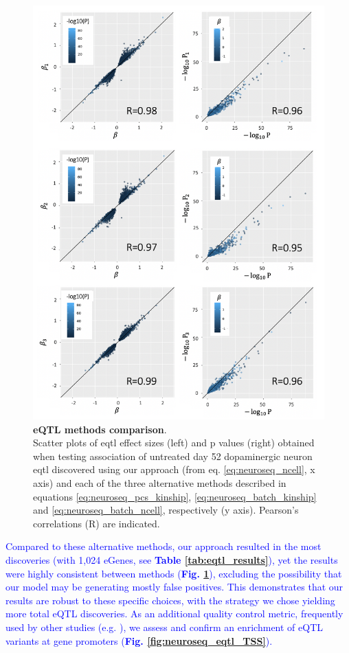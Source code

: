 \begin{figure}[htbp]
\centering
\includegraphics[width=13.5cm]{Chapter5/Fig/neuroseq_eqtl_methods_corr.png}
\caption[eQTL methods comparison]{\textbf{eQTL methods comparison}.\\
Scatter plots of \gls{eqtl} effect sizes (left) and p values (right) obtained when testing association of untreated day 52 dopaminergic neuron \gls{eqtl} discovered using our approach (from eq. \eqref{eq:neuroseq_ncell}, x axis) and each of the three alternative methods described in equations \eqref{eq:neuroseq_pcs_kinship}, \eqref{eq:neuroseq_batch_kinship} and \eqref{eq:neuroseq_batch_ncell}, respectively (y axis). 
Pearson's correlations (R) are indicated.}
\label{fig:neuroseq_eqtl_methods_comp}
\end{figure}


\textcolor{blue}{Compared to these alternative methods, our approach resulted in the most discoveries (with 1,024 eGenes, see \textbf{Table \ref{tab:eqtl_results}}), yet the results were highly consistent between methods (\textbf{Fig. \ref{fig:neuroseq_eqtl_methods_comp}}), excluding the possibility that our model may be generating mostly false positives.
This demonstrates that our results are robust to these specific choices, with the strategy we chose yielding more total eQTL discoveries. 
As an additional quality control metric, frequently used by other studies (e.g. \cite{gtex2015genotype}), we assess and confirm an enrichment of eQTL variants at gene promoters (\textbf{Fig. \ref{fig:neuroseq_eqtl_TSS}}). }

